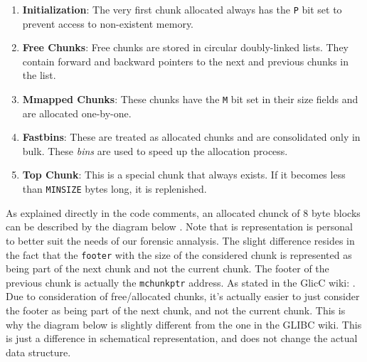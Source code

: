     \begin{enumerate}
        \item \textbf{Initialization}: The very first chunk allocated always has the \texttt{P} bit set to prevent access to non-existent memory.
        
        \item \textbf{Free Chunks}: Free chunks are stored in circular doubly-linked lists. They contain forward and backward pointers to the next and previous chunks in the list.
        
        \item \textbf{Mmapped Chunks}: These chunks have the \texttt{M} bit set in their size fields and are allocated one-by-one.
        
        \item \textbf{Fastbins}: These are treated as allocated chunks and are consolidated only in bulk. These \textit{bins} are used to speed up the allocation process.
        
        \item \textbf{Top Chunk}: This is a special chunk that always exists. If it becomes less than \texttt{MINSIZE} bytes long, it is replenished.
    \end{enumerate}

    As explained directly in the code comments, an allocated chunck of 8 byte blocks can be described by the diagram below \cite{MallocGLIBC2001}. Note that is representation is personal to better suit the needs of our forensic annalysis. The slight difference resides in the fact that the \texttt{footer} with the size of the considered chunk is represented as being part of the next chunk and not the current chunk. The footer of the previous chunk is actually the \texttt{mchunkptr} address. As stated in the GlicC wiki:  \cite{MallocInternalsWiki2023}. Due to consideration of free/allocated chunks, it's actually easier to just consider the footer as being part of the next chunk, and not the current chunk. This is why the diagram below is slightly different from the one in the GLIBC wiki. This is just a difference in schematical representation, and does not change the actual data structure.


